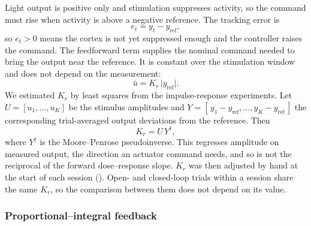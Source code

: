 Light output is positive only and stimulation suppresses activity, so the
command must rise when activity is above a negative reference. The tracking
error is
%
\begin{equation}
    e_{t} = y_{t} - y_{\mathrm{ref}},
    \label{eq:error}
\end{equation}
%
so $e_t > 0$ means the cortex is not yet suppressed enough and the controller
raises the command. The feedforward term supplies the nominal command needed to
bring the output near the reference. It is constant over the stimulation window
and does not depend on the measurement:
%
\begin{equation}
    \bar{u} = K_{r}\,\lvert y_{\mathrm{ref}} \rvert .
    \label{eq:ff}
\end{equation}
%
We estimated $K_{r}$ by least squares from the impulse-response experiments. Let
$U = [u_{1},\ldots,u_{K}]$ be the stimulus amplitudes and
$Y = [\,y_{1} - y_{\mathrm{ref}},\ldots,y_{K} - y_{\mathrm{ref}}\,]$ the
corresponding trial-averaged output deviations from the reference. Then
%
\begin{equation}
    K_{r} = U\,Y^{\dagger},
    \label{eq:kr}
\end{equation}
%
where $Y^{\dagger}$ is the Moore--Penrose pseudoinverse. This regresses amplitude
on measured output, the direction an actuator command needs, and so is not the
reciprocal of the forward dose--response slope. $K_r$ was then adjusted by hand
at the start of each session (). Open- and closed-loop
trials within a session share the same $K_r$, so the comparison between them
does not depend on its value.

\subsubsection*{Proportional--integral feedback}
\label{sec:pi_controller_design}


